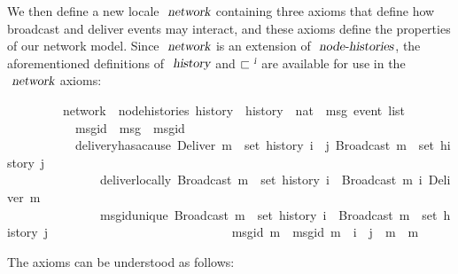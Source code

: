 We then define a new locale $\isa{network}$ containing three axioms that define how broadcast and deliver events may interact, and these axioms define the properties of our network model.
Since $\isa{network}$ is an extension of $\isa{node-histories}$, the aforementioned definitions of $\isa{history}$ and $\sqsubset^\isa{i}$ are available for use in the $\isa{network}$ axioms:
\vspace{0.375em}
\begin{isabellebody}
\ \ \ \ \ \ \ \ \ network\ {\isacharequal}\ node{\isacharunderscore}histories\ history\ \ history\ {\isacharcolon}{\isacharcolon}\ {\isachardoublequoteopen}nat\ {\isasymRightarrow}\ {\isacharprime}msg\ event\ list{\isachardoublequoteclose}\ {\isacharplus}\isanewline
\ \ \ \ \ \ \ \ \ \ \ msg{\isacharunderscore}id\ {\isacharcolon}{\isacharcolon}\ {\isachardoublequoteopen}{\isacharprime}msg\ {\isasymRightarrow}\ {\isacharprime}msgid{\isachardoublequoteclose}\isanewline
\ \ \ \ \ \ \ \ \ \ \ delivery{\isacharunderscore}has{\isacharunderscore}a{\isacharunderscore}cause{\isacharcolon}\ {\isachardoublequoteopen}Deliver\ m\ {\isasymin}\ set\ {\isacharparenleft}history\ i{\isacharparenright}\ {\isasymLongrightarrow}\ {\isasymexists}j{\isachardot}\ Broadcast\ m\ {\isasymin}\ set\ {\isacharparenleft}history\ j{\isacharparenright}{\isachardoublequoteclose}\isanewline
\ \ \ \ \ \ \ \ \ \ \ \ \ \ \ deliver{\isacharunderscore}locally{\isacharcolon}\ {\isachardoublequoteopen}Broadcast\ m\ {\isasymin}\ set\ {\isacharparenleft}history\ i{\isacharparenright}\ {\isasymLongrightarrow}\ Broadcast\ m\ {\isasymsqsubset}\isactrlsup i\ Deliver\ m{\isachardoublequoteclose}\isanewline
\ \ \ \ \ \ \ \ \ \ \ \ \ \ \ msg{\isacharunderscore}id{\isacharunderscore}unique{\isacharcolon}\ {\isachardoublequoteopen}Broadcast\ m{}\ {\isasymin}\ set\ {\isacharparenleft}history\ i{\isacharparenright}\ {\isasymLongrightarrow}\ Broadcast\ m{}\ {\isasymin}\ set\ {\isacharparenleft}history\ j{\isacharparenright}\ {\isasymLongrightarrow}\isanewline
\ \ \ \ \ \ \ \ \ \ \ \ \ \ \ \ \ \ \ \ \ \ \ \ \ \ \ \ msg{\isacharunderscore}id\ m{}\ {\isacharequal}\ msg{\isacharunderscore}id\ m{}\ {\isasymLongrightarrow}\ i\ {\isacharequal}\ j\ {\isasymand}\ m{}\ {\isacharequal}\ m{}{\isachardoublequoteclose}
\end{isabellebody}
\vspace{0.375em}
The axioms can be understood as follows:
